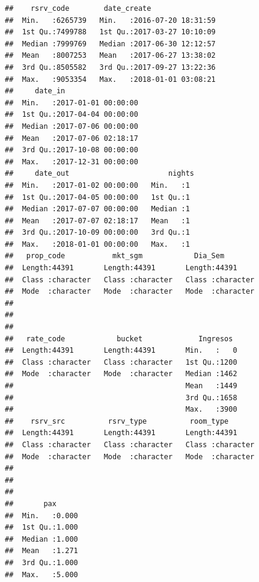 \documentclass{article}\usepackage[]{graphicx}\usepackage[]{color}
\makeatletter
\newenvironment{kframe}{%
 \def\at@end@of@kframe{}%
 \ifinner\ifhmode%
  \def\at@end@of@kframe{\end{minipage}}%
  \begin{minipage}{\columnwidth}%
 \fi\fi%
 \def\FrameCommand##1{\hskip\@totalleftmargin \hskip-\fboxsep
 \colorbox{shadecolor}{##1}\hskip-\fboxsep
     \hskip-\linewidth \hskip-\@totalleftmargin \hskip\columnwidth}%
 \MakeFramed {\advance\hsize-\width
   \@totalleftmargin\z@ \linewidth\hsize
   \@setminipage}}%
 {\par\unskip\endMakeFramed%
 \at@end@of@kframe}
\newenvironment{knitrout}{}{} %
\makeatother
\begin{document}
\begin{knitrout}
\color{fgcolor}\begin{kframe}
\begin{verbatim}
##    rsrv_code        date_create                 
##  Min.   :6265739   Min.   :2016-07-20 18:31:59  
##  1st Qu.:7499788   1st Qu.:2017-03-27 10:10:09  
##  Median :7999769   Median :2017-06-30 12:12:57  
##  Mean   :8007253   Mean   :2017-06-27 13:38:02  
##  3rd Qu.:8505582   3rd Qu.:2017-09-27 13:22:36  
##  Max.   :9053354   Max.   :2018-01-01 03:08:21  
##     date_in                   
##  Min.   :2017-01-01 00:00:00  
##  1st Qu.:2017-04-04 00:00:00  
##  Median :2017-07-06 00:00:00  
##  Mean   :2017-07-06 02:18:17  
##  3rd Qu.:2017-10-08 00:00:00  
##  Max.   :2017-12-31 00:00:00  
##     date_out                       nights 
##  Min.   :2017-01-02 00:00:00   Min.   :1  
##  1st Qu.:2017-04-05 00:00:00   1st Qu.:1  
##  Median :2017-07-07 00:00:00   Median :1  
##  Mean   :2017-07-07 02:18:17   Mean   :1  
##  3rd Qu.:2017-10-09 00:00:00   3rd Qu.:1  
##  Max.   :2018-01-01 00:00:00   Max.   :1  
##   prop_code           mkt_sgm            Dia_Sem         
##  Length:44391       Length:44391       Length:44391      
##  Class :character   Class :character   Class :character  
##  Mode  :character   Mode  :character   Mode  :character  
##                                                          
##                                                          
##                                                          
##   rate_code            bucket             Ingresos   
##  Length:44391       Length:44391       Min.   :   0  
##  Class :character   Class :character   1st Qu.:1200  
##  Mode  :character   Mode  :character   Median :1462  
##                                        Mean   :1449  
##                                        3rd Qu.:1658  
##                                        Max.   :3900  
##    rsrv_src          rsrv_type          room_type        
##  Length:44391       Length:44391       Length:44391      
##  Class :character   Class :character   Class :character  
##  Mode  :character   Mode  :character   Mode  :character  
##                                                          
##                                                          
##                                                          
##       pax       
##  Min.   :0.000  
##  1st Qu.:1.000  
##  Median :1.000  
##  Mean   :1.271  
##  3rd Qu.:1.000  
##  Max.   :5.000
\end{verbatim}
\end{kframe}
\end{knitrout}
\end{document}
